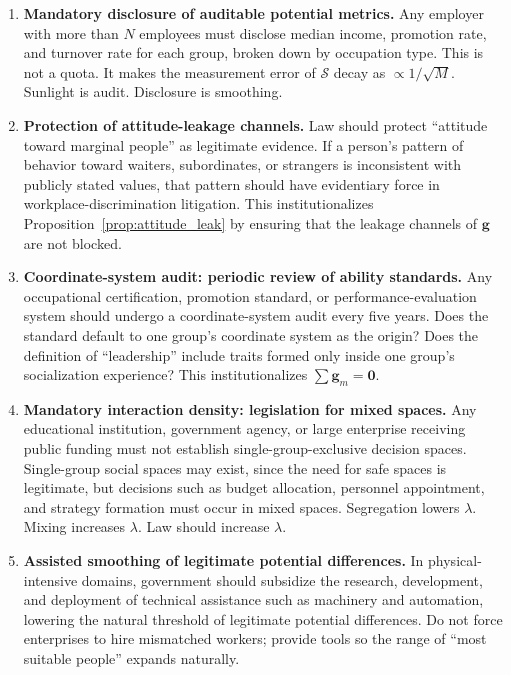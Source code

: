\documentclass[12pt,a4paper]{article}
\theoremstyle{remark}
\begin{document}
\begin{enumerate}[label=\textbf{P\arabic*}]
    \item \textbf{Mandatory disclosure of auditable potential metrics.} Any employer with more than $N$ employees must disclose median income, promotion rate, and turnover rate for each group, broken down by occupation type. This is not a quota. It makes the measurement error of $\mathcal{S}$ decay as $\propto 1/\sqrt{M}$. Sunlight is audit. Disclosure is smoothing.
    
    \item \textbf{Protection of attitude-leakage channels.} Law should protect ``attitude toward marginal people'' as legitimate evidence. If a person's pattern of behavior toward waiters, subordinates, or strangers is inconsistent with publicly stated values, that pattern should have evidentiary force in workplace-discrimination litigation. This institutionalizes Proposition~\ref{prop:attitude_leak} by ensuring that the leakage channels of $\mathbf{g}$ are not blocked.
    
    \item \textbf{Coordinate-system audit: periodic review of ability standards.} Any occupational certification, promotion standard, or performance-evaluation system should undergo a coordinate-system audit every five years. Does the standard default to one group's coordinate system as the origin? Does the definition of ``leadership'' include traits formed only inside one group's socialization experience? This institutionalizes $\sum\mathbf{g}_m = \mathbf{0}$.
    
    \item \textbf{Mandatory interaction density: legislation for mixed spaces.} Any educational institution, government agency, or large enterprise receiving public funding must not establish single-group-exclusive decision spaces. Single-group social spaces may exist, since the need for safe spaces is legitimate, but decisions such as budget allocation, personnel appointment, and strategy formation must occur in mixed spaces. Segregation lowers $\lambda$. Mixing increases $\lambda$. Law should increase $\lambda$.
    
    \item \textbf{Assisted smoothing of legitimate potential differences.} In physical-intensive domains, government should subsidize the research, development, and deployment of technical assistance such as machinery and automation, lowering the natural threshold of legitimate potential differences. Do not force enterprises to hire mismatched workers; provide tools so the range of ``most suitable people'' expands naturally.
    

\end{enumerate}
\end{document}
